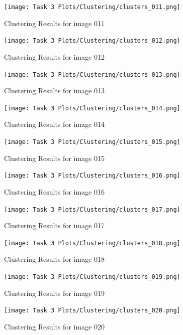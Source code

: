 \documentclass[11pt]{report}
\begin{document}
\begin{figure}[H]
    \centering
    \texttt{[image: Task 3 Plots/Clustering/clusters\_011.png]}
    \caption{Clustering Results for image 011}
    \label{fig:clusters11}
\end{figure}
\begin{figure}[H]
    \centering
    \texttt{[image: Task 3 Plots/Clustering/clusters\_012.png]}
    \caption{Clustering Results for image 012}
    \label{fig:clusters12}
\end{figure}
\begin{figure}[H]
    \centering
    \texttt{[image: Task 3 Plots/Clustering/clusters\_013.png]}
    \caption{Clustering Results for image 013}
    \label{fig:clusters13}
\end{figure}
\begin{figure}[H]
    \centering
    \texttt{[image: Task 3 Plots/Clustering/clusters\_014.png]}
    \caption{Clustering Results for image 014}
    \label{fig:clusters14}
\end{figure}
\begin{figure}[H]
    \centering
    \texttt{[image: Task 3 Plots/Clustering/clusters\_015.png]}
    \caption{Clustering Results for image 015}
    \label{fig:clusters15}
\end{figure}
\begin{figure}[H]
    \centering
    \texttt{[image: Task 3 Plots/Clustering/clusters\_016.png]}
    \caption{Clustering Results for image 016}
    \label{fig:clusters16}
\end{figure}
\begin{figure}[H]
    \centering
    \texttt{[image: Task 3 Plots/Clustering/clusters\_017.png]}
    \caption{Clustering Results for image 017}
    \label{fig:clusters17}
\end{figure}
\begin{figure}[H]
    \centering
    \texttt{[image: Task 3 Plots/Clustering/clusters\_018.png]}
    \caption{Clustering Results for image 018}
    \label{fig:clusters18}
\end{figure}
\begin{figure}[H]
    \centering
    \texttt{[image: Task 3 Plots/Clustering/clusters\_019.png]}
    \caption{Clustering Results for image 019}
    \label{fig:clusters19}
\end{figure}
\begin{figure}[H]
    \centering
    \texttt{[image: Task 3 Plots/Clustering/clusters\_020.png]}
    \caption{Clustering Results for image 020}
    \label{fig:clusters20}
\end{figure}
\end{document}
